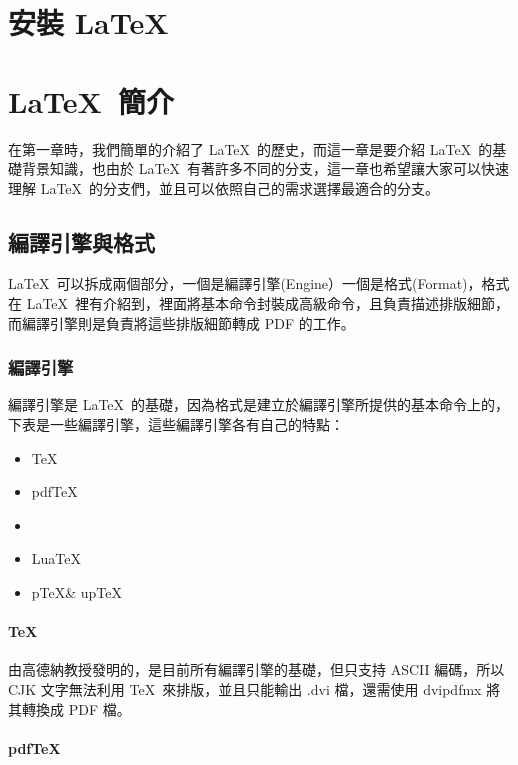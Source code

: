 \chapter{安裝 \LaTeX}


\chapter{\LaTeX\ 簡介}

在第一章時，我們簡單的介紹了 \LaTeX\ 的歷史，而這一章是要介紹 \LaTeX\ 的基礎背景知識，也由於 \LaTeX\ 有著許多不同的分支，這一章也希望讓大家可以快速理解 \LaTeX\ 的分支們，並且可以依照自己的需求選擇最適合的分支。

\section{編譯引擎與格式}

\LaTeX\ 可以拆成兩個部分，一個是編譯引擎(Engine）一個是格式(Format)，格式在 \LaTeX\ 裡有介紹到，裡面將基本命令封裝成高級命令，且負責描述排版細節，而編譯引擎則是負責將這些排版細節轉成 PDF 的工作。

\subsection{編譯引擎}

編譯引擎是 \LaTeX\ 的基礎，因為格式是建立於編譯引擎所提供的基本命令上的，下表是一些編譯引擎，這些編譯引擎各有自己的特點：

\begin{itemize}
\item \TeX
\item pdf\TeX
\item \XeTeX
\item Lua\TeX
\item p\TeX \& up\TeX
\end{itemize}

\subsubsection{\TeX}

由高德納教授發明的，是目前所有編譯引擎的基礎，但只支持 ASCII 編碼，所以 CJK 文字無法利用 \TeX\ 來排版，並且只能輸出 .dvi 檔，還需使用 dvipdfmx 將其轉換成 PDF 檔。

\subsubsection{pdf\TeX}

